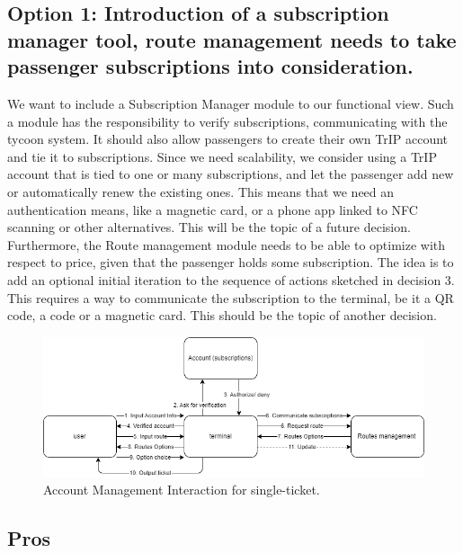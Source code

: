 \subsection*{Option 1: Introduction of a subscription manager tool, route management needs to take passenger subscriptions into consideration.}
We want to include a Subscription Manager module to our functional view. 
Such a module has the responsibility to verify subscriptions, communicating with the tycoon system.
It should also allow passengers to create their own TrIP account and tie it to subscriptions.
Since we need scalability, we consider using a TrIP account that is tied to one or many subscriptions, and let the passenger add new or automatically renew the existing ones.
This means that we need an authentication means, like a magnetic card, or a phone app linked to NFC scanning or other alternatives.
This will be the topic of a future decision.
Furthermore, the Route management module needs to be able to optimize with respect to price, given that the passenger holds some subscription.
The idea is to add an optional initial iteration to the sequence of actions sketched in decision 3.
This requires a way to communicate the subscription to the terminal, be it a QR code, a code or a magnetic card. 
This should be the topic of another decision.
\begin{figure}[ht]
    \centering
    \includegraphics[width=\textwidth]{drawings/decision4_drawings/account_functional.png}
    \caption{Account Management Interaction for single-ticket.}
    \label{fig:account_management_ticket}
\end{figure}
\subsection*{Pros}

